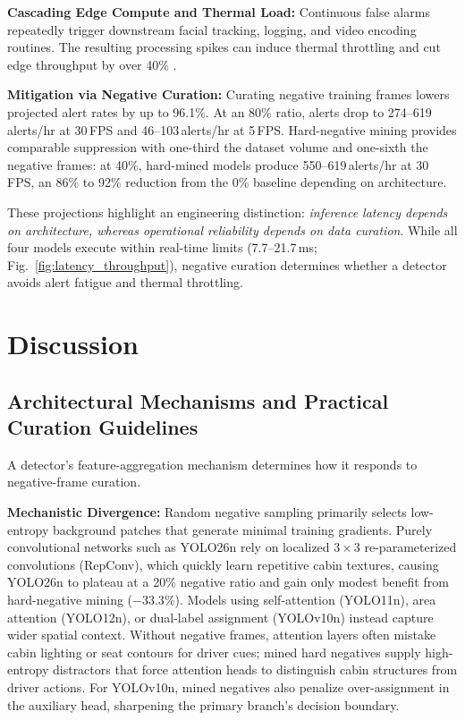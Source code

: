\documentclass[conference]{IEEEtran}
\begin{document}
\textbf{Cascading Edge Compute and Thermal Load:} Continuous false alarms repeatedly trigger downstream facial tracking, logging, and video encoding routines. The resulting processing spikes can induce thermal throttling and cut edge throughput by over 40\% \cite{florez2024real, benoitcattin2020thermal}.

\textbf{Mitigation via Negative Curation:} Curating negative training frames lowers projected alert rates by up to 96.1\%. At an 80\% ratio, alerts drop to 274--619\,alerts/hr at 30\,FPS and 46--103\,alerts/hr at 5\,FPS. Hard-negative mining provides comparable suppression with one-third the dataset volume and one-sixth the negative frames: at 40\%, hard-mined models produce 550--619\,alerts/hr at 30\,FPS, an 86\% to 92\% reduction from the 0\% baseline depending on architecture.

These projections highlight an engineering distinction: \textit{inference latency depends on architecture, whereas operational reliability depends on data curation}. While all four models execute within real-time limits (7.7--21.7\,ms; Fig.~\ref{fig:latency_throughput}), negative curation determines whether a detector avoids alert fatigue and thermal throttling.

\section{Discussion}
\label{sec:discussion}

\subsection{Architectural Mechanisms and Practical Curation Guidelines}
\label{subsec:guidelines}
A detector's feature-aggregation mechanism determines how it responds to negative-frame curation.

\textbf{Mechanistic Divergence:} Random negative sampling primarily selects low-entropy background patches that generate minimal training gradients. Purely convolutional networks such as YOLO26n rely on localized $3 \times 3$ re-parameterized convolutions (RepConv), which quickly learn repetitive cabin textures, causing YOLO26n to plateau at a 20\% negative ratio and gain only modest benefit from hard-negative mining ($-33.3\%$). Models using self-attention (YOLO11n), area attention (YOLO12n), or dual-label assignment (YOLOv10n) instead capture wider spatial context. Without negative frames, attention layers often mistake cabin lighting or seat contours for driver cues; mined hard negatives supply high-entropy distractors that force attention heads to distinguish cabin structures from driver actions. For YOLOv10n, mined negatives also penalize over-assignment in the auxiliary head, sharpening the primary branch's decision boundary.
\end{document}
